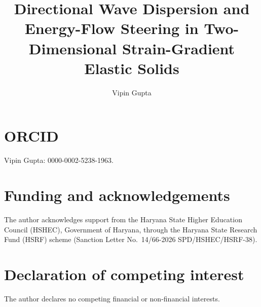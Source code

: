 \documentclass[preprint,12pt]{elsarticle}
\begin{document}
\begin{frontmatter}
\title{Directional Wave Dispersion and Energy-Flow Steering in Two-Dimensional Strain-Gradient Elastic Solids}
\author[gu]{Vipin Gupta}
\address[gu]{Department of Mathematics, Gurugram University, Gurugram 122505, Haryana, India}
\end{frontmatter}
\section*{ORCID}
Vipin Gupta: 0000-0002-5238-1963.
\section*{Funding and acknowledgements}
The author acknowledges support from the Haryana State Higher Education Council (HSHEC), Government of Haryana, through the Haryana State Research Fund (HSRF) scheme (Sanction Letter No.\ 14/66-2026 SPD/HSHEC/HSRF-38).
\section*{Declaration of competing interest}
The author declares no competing financial or non-financial interests.
\end{document}
